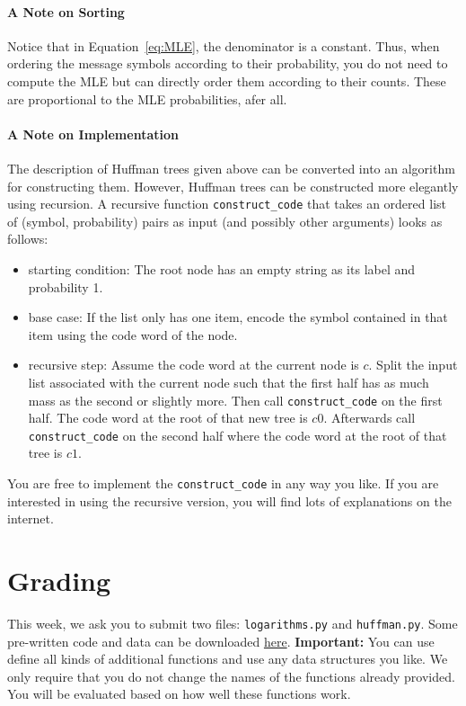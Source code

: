 \documentclass[11pt, leqno, a4paper]{article}
\begin{document}
\paragraph{A Note on Sorting} Notice that in Equation~\eqref{eq:MLE}, the denominator is a constant. Thus, when ordering the message symbols according to
their probability, you do not need to compute the MLE but can directly order them according to their counts. These are proportional to the MLE probabilities,
afer all.

\paragraph{A Note on Implementation} The description of Huffman trees given above can be converted into an algorithm for constructing them. However, Huffman trees can
be constructed more elegantly using recursion. A recursive function \texttt{construct\_code} that takes an ordered list of (symbol, probability) pairs as input (and
possibly other arguments) looks as follows:
\begin{itemize}
\item starting condition: The root node has an empty string as its label and probability 1.
\item base case: If the list only has one item, encode the symbol contained in that item using the code word of the node.
\item recursive step: Assume the code word at the current node is $ c $. Split the input list associated with the current node
such that the first half has as much mass as the second or slightly more. Then call \texttt{construct\_code} on the first half. The code word
at the root of that new tree is $ c0 $. Afterwards call \texttt{construct\_code} on the second half where the code word at the root of that tree is $ c1 $.
\end{itemize} 

You are free to implement the \texttt{construct\_code} in any way you like. If you are interested in using the recursive version, you will find lots of
explanations on the internet.

\section{Grading}
This week, we ask you to submit two files: \texttt{logarithms.py} and \texttt{huffman.py}. Some pre-written code and data can be downloaded \href{https://github.com/BasicProbability/BasicProbability.github.io/raw/master/Homework/Programming/2016-17/Assignment3/assignment3_prerequisites.zip}{here}.
\textbf{Important:} You can use define all kinds of additional functions and use any data structures you like. We only require that you do not change the
names of the functions already provided. You will be evaluated based on how well these functions work.
\end{document}
